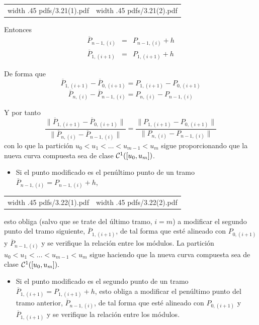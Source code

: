 \documentclass[twoside]{report}
\newcommand{\colocapdf}[2]{\quad\pdfimage width #2 {pdfs/#1.pdf}}
\begin{document}
\begin{center}
\begin{tabular}{cc}
\colocapdf{3.21(1)}{.45\textwidth} &
\colocapdf{3.21(2)}{.45\textwidth}
\end{tabular}
\end{center}


Entonces $$\begin{array}{rcl} \overline{P}_{n-1, (i)}&=&P_{n-1, (i)}+h\\ \overline{P}_{1, (i+1)}&=&P_{1, (i+1)}+h \end{array}$$

De forma que
$$\overline{P}_{1, (i+1)}-\overline{P}_{0, (i+1)}=P_{1, (i+1)}-P_{0, (i+1)}$$
$$\overline{P}_{n, (i)}-\overline{P}_{n-1, (i)}=P_{n, (i)}-P_{n-1, (i)}$$

Y por tanto
$$\frac{\parallel \overline{P}_{1,(i+1)}-\overline{P}_{0,(i+1)}\parallel}{\parallel \overline{P}_{n, (i)}-\overline{P}_{n-1,(i)} \parallel}=\frac{\parallel P_{1,(i+1)}-P_{0,(i+1)}\parallel}{\parallel P_{n, (i)}-P_{n-1,(i)} \parallel}$$
con lo que la partici\'{o}n $u_0<u_1<\ldots<u_{m-1}<u_m$ sigue proporcionando que la nueva curva compuesta sea de clase ${\cal C}^1([u_0,u_m])$.

\begin{itemize}
\item Si el punto modificado es el pen\'{u}ltimo punto de un tramo $\overline{P}_{n-1,(i)}=P_{n-1,(i)}+h$,
\end{itemize}

\begin{center}
\begin{tabular}{cc}
\colocapdf{3.22(1)}{.45\textwidth} &
\colocapdf{3.22(2)}{.45\textwidth}
\end{tabular}
\end{center}

esto obliga (salvo que se trate del \'{u}ltimo tramo, $i=m$) a modificar el segundo punto del tramo siguiente, $\overline{P}_{1,(i+1)}$, de tal forma que est\'{e} alineado con $P_{0,(i+1)}$ y $\overline{P}_{n-1,(i)}$  y se verifique la relaci\'{o}n entre los m\'{o}dulos.
La partici\'{o}n $u_0<u_1<\ldots<u_{m-1}<u_m$ sigue haciendo que la nueva curva compuesta sea de clase ${\cal C}^1([u_0,u_m]).$

\begin{itemize}
\item Si el punto modificado es el segundo punto de un tramo $\overline{P}_{1,(i+1)}=P_{1,(i+1)}+h$, esto obliga a modificar el pen\'{u}ltimo punto del tramo anterior, $\overline{P}_{n-1,(i)}$, de tal forma que est\'{e} alineado con $P_{0,(i+1)}$ y $\overline{P}_{1,(i+1)}$  y se verifique la relaci\'{o}n entre los m\'{o}dulos.
\end{itemize}
\end{document}
